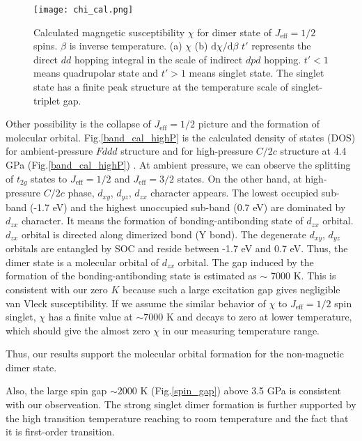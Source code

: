 \documentclass[a4,10.5pt]{report}
\begin{document}
\begin{figure}
  \centering
  \texttt{[image: chi\_cal.png]}
  \caption{Calculated magngetic susceptibility $\chi$ for dimer state of $J_{\mathrm{eff}} = 1/2$ spins.
  $\beta$ is inverse temperature. \cite{Nasu2014}
  (a) $\chi$
  (b) $\mathrm{d}\chi/\mathrm{d}\beta$
  $t'$ represents the direct $dd$ hopping integral in the scale of indirect $dpd$ hopping. 
  $t' < 1$ means quadrupolar state and $t' > 1$ means singlet state.
  The singlet state has a finite peak structure at the temperature scale of singlet-triplet gap.}
  \label{chi_cal}
\end{figure}

Other possibility is the collapse of $J_{\mathrm{eff}} = 1/2$ picture and the formation of molecular orbital. 
Fig.\ref{band_cal_highP} is the calculated density of states (DOS) for ambient-pressure $Fddd$ structure and for high-pressure $C/2c$ structure at 4.4 GPa (Fig.\ref{band_cal_highP})
\cite{takayama2018pressure}.
At ambient pressure, we can observe the splitting of $t_{2g}$ states to $J_{\mathrm{eff}} = 1/2$ and $J_{\mathrm{eff}} = 3/2$ states.
On the other hand, at high-pressure $C/2c$ phase, $d_{xy}$, $d_{yz}$, $d_{zx}$ character appears.
The lowest occupied sub-band (-1.7 eV) and the highest unoccupied sub-band (0.7 eV) are dominated by $d_{zx}$ character.
It means the formation of bonding-antibonding state of $d_{zx}$ orbital.
$d_{zx}$ orbital is directed along dimerized bond (Y bond).
The degenerate $d_{xy}$, $d_{yz}$ orbitals are entangled by SOC and reside between -1.7 eV and 0.7 eV.
Thus, the dimer state is a molecular orbital of $d_{zx}$ orbital. 
The gap induced by the formation of the bonding-antibonding state is estimated as $\sim$ 7000 K. 
This is consistent with our zero $K$ because such a large excitation gap gives negligible van Vleck susceptibility.
If we assume the similar behavior of $\chi$ to $J_{\mathrm{eff}} = 1/2$ spin singlet, $\chi$ has a finite value at $\sim 7000$ K and decays to zero at lower temperature,
which should give the almost zero $\chi$ in our measuring temperature range.

Thus, our results support the molecular orbital formation for the non-magnetic dimer state. 

Also, the large spin gap $\sim 2000$ K (Fig.\ref{spin_gap}) above 3.5 GPa is consistent with our observeation.
The strong singlet dimer formation is further supported by the high transition temperature reaching to room temperature and the fact that it is first-order transition.
\end{document}

